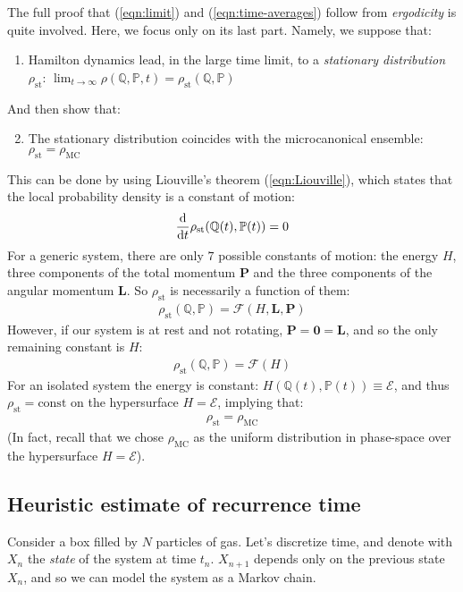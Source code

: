 \documentclass[../template.tex]{subfiles}
\begin{document}
The full proof that (\ref{eqn:limit}) and (\ref{eqn:time-averages}) follow from \textit{ergodicity} is quite involved. Here, we focus only on its last part. Namely, we suppose that:
\begin{enumerate}
    \item Hamilton dynamics lead, in the large time limit, to a \textit{stationary distribution} $\rho_{\mathrm{st}}$: 
    $\displaystyle \lim_{t \to \infty} \rho(\mathbb{Q}, \mathbb{P}, t) = \rho_{\mathrm{st}}(\mathbb{Q}, \mathbb{P})$
\end{enumerate}
And then show that:
\begin{enumerate}
    \setcounter{enumi}{1}
    \item The stationary distribution coincides with the microcanonical ensemble: $\rho_{\mathrm{st}} = \rho_{\mathrm{MC}}$
\end{enumerate}
This can be done by using Liouville's theorem (\ref{eqn:Liouville}), which states that the local probability density is a constant of motion:
\begin{align*}
    \dv{t} \rho_{\mathrm{st}}(\mathbb{Q}(t), \mathbb{P}(t)) = 0
\end{align*}
For a generic system, there are only $7$ possible constants of motion: the energy $H$, three components of the total momentum $\bm{P}$ and the three components of the angular momentum $\bm{L}$. So $\rho_{\mathrm{st}}$ is necessarily a function of them:
\begin{align*}
    \rho_{\mathrm{st}}(\mathbb{Q}, \mathbb{P}) = \mathcal{F}(H, \bm{L}, \bm{P})
\end{align*}
However, if our system is at rest and not rotating, $\bm{P} = \bm{0} = \bm{L}$, and so the only remaining constant is $H$:
\begin{align*}
    \rho_{\mathrm{st}}(\mathbb{Q}, \mathbb{P}) = \mathcal{F}(H)
\end{align*}
For an isolated system the energy is constant: $H(\mathbb{Q}(t), \mathbb{P}(t)) \equiv \mathcal{E}$, and thus $\rho_{\mathrm{st}} = \text{const}$ on the hypersurface $H=\mathcal{E}$, implying that:
\begin{align*}
    \rho_{\mathrm{st}} = \rho_{\mathrm{MC}}
\end{align*}
(In fact, recall that we chose $\rho_{\mathrm{MC}}$ as the uniform distribution in phase-space over the hypersurface $H=\mathcal{E}$).

\subsection{Heuristic estimate of recurrence time}
Consider a box filled by $N$ particles of gas. Let's discretize time, and denote with $X_n$ the \textit{state} of the system at time $t_n$. $X_{n+1}$ depends only on the previous state $X_n$, and so we can model the system as a Markov chain. %
\end{document}
